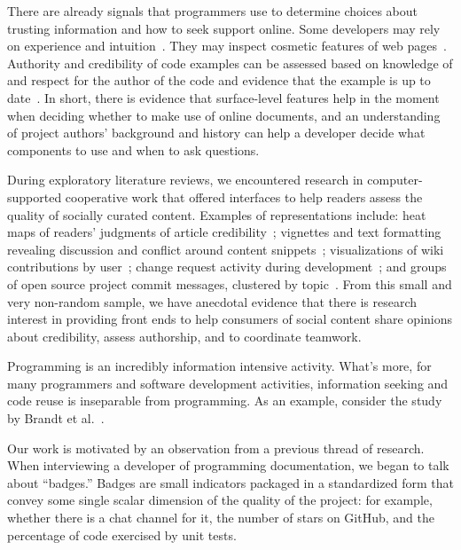 There are already signals that programmers use to determine choices about trusting information and how to seek support online.
Some developers may rely on experience and intuition~\cite{storey_revolution_2014}.
They may inspect cosmetic features of web pages~\cite{brandt_two_2009}.
Authority and credibility of code examples can be assessed based on knowledge of and respect for the author of the code and evidence that the example is up to date~\cite{robillard_field_2011}.
In short, there is evidence that surface-level features help in the moment when deciding whether to make use of online documents, and an understanding of project authors' background and history can help a developer decide what components to use and when to ask questions.

During exploratory literature reviews, we encountered research in computer-supported cooperative work that offered interfaces to help readers assess the quality of socially curated content.
Examples of representations include: heat maps of readers' judgments of article credibility~\cite{pirolli_so_2009};
vignettes and text formatting revealing discussion and conflict around content snippets~\cite{towne_your_2013,borra_societal_2015};
visualizations of wiki contributions by user~\cite{arazy_recognizing_2010};
change request activity during development~\cite{begel_codebook_2010};
and groups of open source project commit messages, clustered by topic~\cite{hindle_whats_2009}.
From this small and very non-random sample, we have anecdotal evidence that there is research interest in providing front ends to help consumers of social content share opinions about credibility, assess authorship, and to coordinate teamwork.

Programming is an incredibly information intensive activity.
What's more, for many programmers and software development activities, information seeking and code reuse is inseparable from programming.
As an example, consider the study by Brandt et al.~\cite{brandt_two_2009}.

Our work is motivated by an observation from a previous thread of research.
When interviewing a developer of programming documentation, we began to talk about ``badges.''
Badges are small indicators packaged in a standardized form that convey some single scalar dimension of the quality of the project:
for example, whether there is a chat channel for it, the number of stars on GitHub, and the percentage of code exercised by unit tests.

